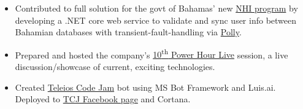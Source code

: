 \documentclass{resume}
\newcommand{\ts}{\textsuperscript}
\begin{document}
\begin{minipage}[t]{0.66\linewidth}
\begin{itemize}
    \item Contributed to full solution for the govt of Bahamas' new \href{http://www.nhibahamas.gov.bs/}{NHI program} by developing a .NET core web service to validate and sync user info between Bahamian databases with transient-fault-handling via \href{https://github.com/App-vNext/Polly}{Polly}.
    \item Prepared and hosted the company's \href{https://www.teleioscodejam.com/news/2017/8/11/powar-hour-live}{10\ts{th} Power Hour Live} session, a live discussion/showcase of current, exciting technologies.
    \item Created \href{https://www.teleioscodejam.com/}{Teleios Code Jam} bot using MS Bot Framework and Luis.ai. Deployed to \href{https://www.facebook.com/TeleiosCodeJam/}{TCJ Facebook page} and Cortana.
\end{itemize}


\end{minipage}
\end{document}
